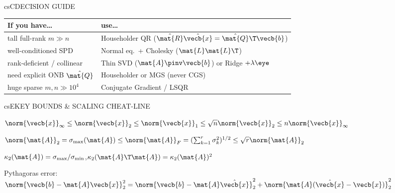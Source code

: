 \documentclass[../../../../master.tex]{subfiles}
\begin{document}
\begin{cscolumns}
\begin{cscard}{csC}{DECISION GUIDE}
  \renewcommand{\arraystretch}{1.22}\small
  \begin{tabular}{@{}>{\raggedright\arraybackslash}p{3.1cm}>{\raggedright\arraybackslash}p{4.6cm}@{}}
    \textbf{If you have\ldots} & \textbf{use\ldots}\\ \hline
    tall full-rank $m\gg n$ & Householder QR ($\hat{\mat{R}}\hat{\vecb{x}}=\hat{\mat{Q}}\T\vecb{b}$)\\
    well-conditioned SPD & Normal eq.\ + Cholesky ($\mat{L}\mat{L}\T$)\\
    rank-deficient / collinear & Thin SVD ($\mat{A}\pinv\vecb{b}$) or Ridge $+\lambda\eye$\\
    need explicit ONB $\hat{\mat{Q}}$ & Householder or MGS (never CGS)\\
    huge sparse $m,n\gg 10^4$ & Conjugate Gradient / LSQR\\
  \end{tabular}
\end{cscard}

\begin{cscard}{csE}{KEY BOUNDS \& SCALING CHEAT-LINE}
  \begin{csbul}
    \item $\norm{\vecb{x}}_\infty \le \norm{\vecb{x}}_2 \le \norm{\vecb{x}}_1 \le \sqrt{n}\norm{\vecb{x}}_2 \le n\norm{\vecb{x}}_\infty$
    \item $\norm{\mat{A}}_2 = \sigma_{\max}(\mat{A}) \le \norm{\mat{A}}_F = (\sum_{k=1}^r\sigma_k^2)^{1/2} \le \sqrt{r}\norm{\mat{A}}_2$
    \item $\kappa_2(\mat{A}) = \sigma_{\max}/\sigma_{\min}$,\quad $\kappa_2(\mat{A}\T\mat{A}) = \kappa_2(\mat{A})^2$
    \item Pythagoras error: $\norm{\vecb{b}-\mat{A}\vecb{x}}_2^2 = \norm{\vecb{b}-\mat{A}\hat{\vecb{x}}}_2^2 + \norm{\mat{A}(\hat{\vecb{x}}-\vecb{x})}_2^2$
  \end{csbul}
\end{cscard}


\end{cscolumns}
\end{document}
